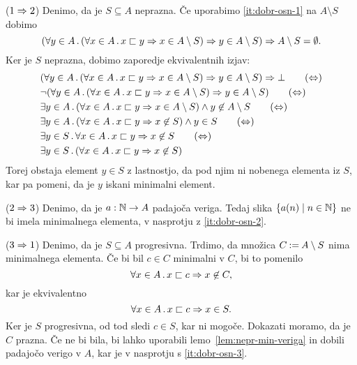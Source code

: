 \begin{dokaz}
  ($1 \Rightarrow 2$)
  Denimo, da je $S \subseteq A$ neprazna. Če uporabimo \eqref{it:dobr-osn-1} na $A \setminus S$ dobimo
  \begin{equation*}
    (\forall y \in A \,.\, (\forall x \in A \,.\, x \sqsubset y \Rightarrow x \in A \setminus S) \Rightarrow y \in A \setminus S) \Rightarrow A \setminus S = \emptyset.
  \end{equation*}
  Ker je $S$ neprazna, dobimo zaporedje ekvivalentnih izjav:
  \begin{align*}
    &(\all{y \in A} (\all{x \in A} x \sqsubset y \lthen x \in A \setminus S) \lthen y \in A \setminus S) \lthen \bot
    \tag{$\liff$} \\
    &\lnot (\all{y \in A} (\all{x \in A} x \sqsubset y \lthen x \in A \setminus S) \lthen y \in A \setminus S)
    \tag{$\liff$} \\
    &\some{y \in A} (\all{x \in A} x \sqsubset y \lthen x \in A \setminus S) \land y \not\in A \setminus S
    \tag{$\liff$} \\
    &\some{y \in A} (\all{x \in A} x \sqsubset y \lthen x \not\in S) \land y \in S
    \tag{$\liff$} \\
    &\some{y \in S} \all{x \in A} x \sqsubset y \lthen x \not\in S
    \tag{$\liff$} \\
    &\some{y \in S} (\all{x \in A} x \sqsubset y \lthen x \not\in S) \notag
  \end{align*}
  Torej obstaja element $y \in S$ z lastnostjo, da pod njim ni nobenega elementa iz
  $S$, kar pa pomeni, da je $y$ iskani minimalni element.

  ($2 \Rightarrow 3$) Denimo, da je $a : \mathbb{N} \to A$ padajoča veriga. Tedaj slika $\left\{ a(n) \mid n \in \mathbb{N} \right\}$ ne bi imela
  minimalnega elementa, v nasprotju z \eqref{it:dobr-osn-2}.

  ($3 \Rightarrow 1$) Denimo, da je $S \subseteq A$ progresivna. Trdimo, da množica $C \mathbin{{:}{=}} A \setminus S$ nima
  minimalnega elementa. Če bi bil $c \in C$ minimalni v $C$, bi to pomenilo
  \begin{equation*}
    \forall x \in A \,.\, x \sqsubset c \Rightarrow x \not\in C,
  \end{equation*}
  kar je ekvivalentno
  \begin{equation*}
    \forall x \in A \,.\, x \sqsubset c \Rightarrow x \in S.
  \end{equation*}
  Ker je $S$ progresivna, od tod sledi $c \in S$, kar ni mogoče.
  Dokazati moramo, da je $C$ prazna. Če ne bi bila, bi lahko uporabili lemo~\ref{lem:nepr-min-veriga} in dobili padajočo verigo v $A$, kar je v nasprotju s \eqref{it:dobr-osn-3}.
\end{dokaz}

